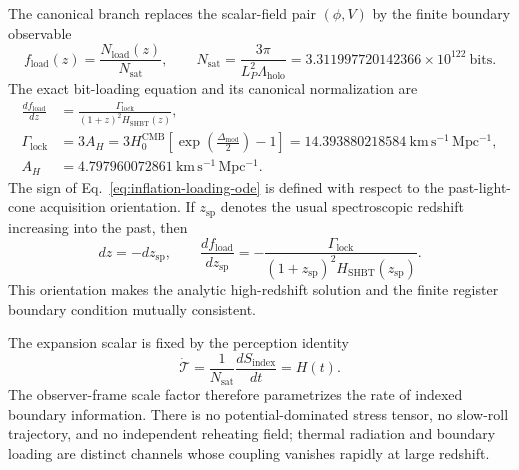 \documentclass[11pt,letterpaper]{article}
\theoremstyle{plain}
\newcommand{\Lholo}{\Lambda_{\text{holo}}}
\newcommand{\Nsat}{N_{\text{sat}}}
\newcommand{\Lp}{L_P}
\newcommand{\hcmb}{H_0^{\text{CMB}}}
\newcommand{\kmsmpc}{\mathrm{km\,s^{-1}\,Mpc^{-1}}}
\newcommand{\DeltaMod}{\Delta_{\text{mod}}}
\newcommand{\fload}{f_{\text{load}}}
\newcommand{\GammaLock}{\Gamma_{\text{lock}}}
\newcommand{\AH}{A_H}
\begin{document}
The canonical branch replaces the scalar-field pair $(\phi,V)$ by the finite
boundary observable
\begin{equation}
\label{eq:inflation-loading-fraction}
 \fload(z)
 =
 \frac{N_{\mathrm{load}}(z)}{\Nsat},
 \qquad
 \Nsat
 =
 \frac{3\pi}{\Lp^2\Lholo}
 =3.311997720142366\times10^{122}\ \mathrm{bits}.
\end{equation}
The exact bit-loading equation and its canonical normalization are
\begin{align}
\label{eq:inflation-loading-ode}
 \frac{d\fload}{dz}
 &=
 \frac{\GammaLock}{(1+z)^2H_{\mathrm{SHBT}}(z)},
 \\
\label{eq:inflation-lock-normalization}
 \GammaLock
 &=3\AH
 =3\hcmb\left[\exp\!\left(\frac{\DeltaMod}{2}\right)-1\right]
 =14.393880218584\ \kmsmpc,
 \\
 \AH
 &=4.797960072861\ \kmsmpc.
\end{align}
The sign of Eq.~\eqref{eq:inflation-loading-ode} is defined with respect to the
past-light-cone acquisition orientation.  If $z_{\mathrm{sp}}$ denotes the
usual spectroscopic redshift increasing into the past, then
\begin{equation}
\label{eq:lightcone-redshift-orientation}
 dz=-dz_{\mathrm{sp}},
 \qquad
 \frac{d\fload}{dz_{\mathrm{sp}}}
 =-\frac{\GammaLock}
 {(1+z_{\mathrm{sp}})^2H_{\mathrm{SHBT}}(z_{\mathrm{sp}})}.
\end{equation}
This orientation makes the analytic high-redshift solution and the finite
register boundary condition mutually consistent.

The expansion scalar is fixed by the perception identity
\begin{equation}
\label{eq:inflation-perception-identity}
 \boxed{
 \dot{\mathcal T}
 =
 \frac{1}{\Nsat}\frac{dS_{\mathrm{index}}}{dt}
 =H(t).}
\end{equation}
The observer-frame scale factor therefore parametrizes the rate of indexed
boundary information.  There is no potential-dominated stress tensor, no
slow-roll trajectory, and no independent reheating field; thermal radiation
and boundary loading are distinct channels whose coupling vanishes rapidly at
large redshift.
\end{document}
